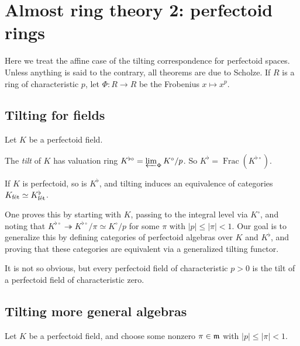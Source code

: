 
\section{Almost ring theory 2: perfectoid rings}


Here we treat the affine case of the tilting correspondence for perfectoid 
spaces. Unless anything is said to the contrary, all theorems are due to 
Scholze. If $R$ is a ring of characteristic $p$, let 
$\Phi:R\to R$ be the Frobenius $x\mapsto x^p$. 





\subsection{Tilting for fields}

Let $K$ be a perfectoid field. 

\begin{definition}
The \emph{tilt} of $K$ has valuation ring 
$K^{\flat\circ} = \varprojlim_\Phi K^\circ/p$. So  
$K^\flat=\operatorname{Frac}(K^{\flat\circ})$. 
\end{definition}

\begin{theorem}
If $K$ is perfectoid, so is $K^\flat$, and tilting induces an equivalence of 
categories $K_{\textnormal{f\'et}}\simeq K_{\textnormal{f\'et}}^\flat$. 
\end{theorem}

One proves this by starting with $K$, passing to the integral level via 
$K^\circ$, and noting 
that $K^{\flat\circ}\twoheadrightarrow K^{\flat\circ}/\pi \simeq K^\circ/p$ for 
some $\pi$ with $|p|\leqslant |\pi|<1$. Our goal is to generalize this by 
defining categories of perfectoid algebras over $K$ and $K^\flat$, and proving 
that these categories are equivalent via a generalized tilting functor. 

It is not so obvious, but every perfectoid field of characteristic $p>0$ is 
the tilt of a perfectoid field of characteristic zero. 





\subsection{Tilting more general algebras}

Let $K$ be a perfectoid field, and choose some nonzero $\pi\in\mathfrak{m}$ with 
$|p|\leqslant |\pi| < 1$. 

